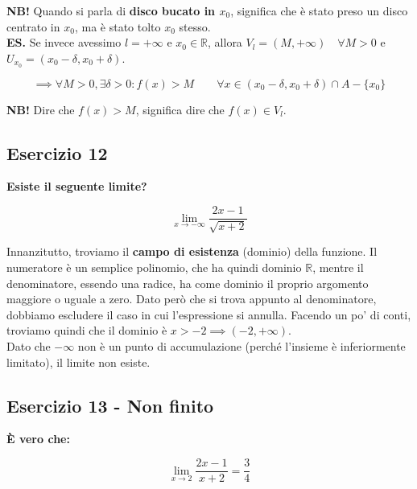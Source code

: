 \documentclass{article}
\begin{document}
\noindent\textbf{NB!} Quando si parla di \textbf{disco bucato in $x_0$}, significa che è stato preso un disco centrato in $x_0$, ma è stato tolto $x_0$ stesso.\\

\noindent\textbf{ES.} Se invece avessimo $l = + \infty$ e $x_0 \in \mathbb{R}$, allora $V_l = (M, + \infty) \quad \forall M > 0$ e $U_{x_0} = (x_0 - \delta, x_0 + \delta)$.

\begin{equation*}
    \implies \forall M > 0, \exists \delta > 0 : f(x) > M \qquad \forall x \in (x_0 - \delta, x_0 + \delta) \cap A - \{x_0\}
\end{equation*}

\noindent\textbf{NB!} Dire che $f(x) > M$, significa dire che $f(x) \in V_l$.

\subsection{Esercizio 12}
\textbf{Esiste il seguente limite?}

\begin{equation*}
    \lim_{x \to -\infty} \frac{2x-1}{\sqrt{x+2}}
\end{equation*}

\noindent Innanzitutto, troviamo il \textbf{campo di esistenza} (dominio) della funzione. Il numeratore è un semplice polinomio, che ha quindi dominio $\mathbb{R}$, mentre il denominatore, essendo una radice, ha come dominio il proprio argomento maggiore o uguale a zero. Dato però che si trova appunto al denominatore, dobbiamo escludere il caso in cui l'espressione si annulla. Facendo un po' di conti, troviamo quindi che il dominio è $x > -2 \implies (-2, + \infty)$.\\

\noindent Dato che $-\infty$ non è un punto di accumulazione (perché l'insieme è inferiormente limitato), il limite non esiste.

\subsection{Esercizio 13 - Non finito}
\textbf{È vero che:}

\begin{equation*}
    \lim_{x \to 2} \frac{2x-1}{x+2} = \frac{3}{4}
\end{equation*}
\end{document}
